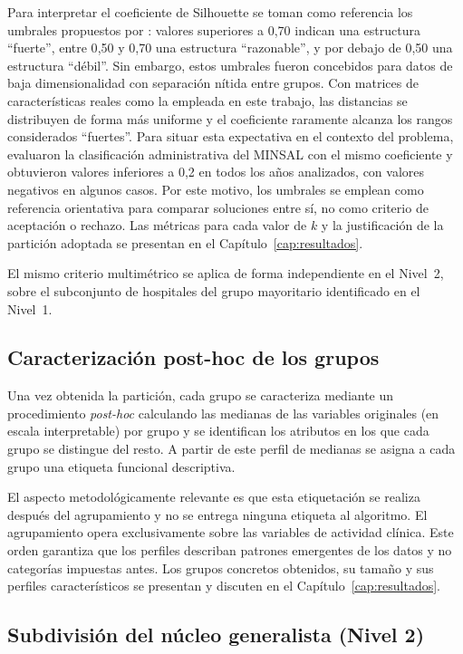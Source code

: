Para interpretar el coeficiente de Silhouette se toman como referencia los
umbrales propuestos por \citet{Rousseeuw1987}: valores superiores a
0{,}70 indican una estructura ``fuerte'', entre 0{,}50 y 0{,}70 una estructura
``razonable'', y por debajo de 0{,}50 una estructura ``débil''. Sin embargo,
estos umbrales fueron concebidos para datos de baja dimensionalidad con separación
nítida entre grupos. Con matrices de características reales como la empleada en
este trabajo, las distancias se distribuyen de forma más uniforme y el coeficiente
raramente alcanza los rangos considerados ``fuertes''. Para situar esta expectativa
en el contexto del problema, \citet{Giglio2021} evaluaron la
clasificación administrativa del MINSAL con el mismo coeficiente y obtuvieron
valores inferiores a 0{,}2 en todos los años analizados, con valores negativos en
algunos casos. Por este motivo, los umbrales se emplean como referencia
orientativa para comparar soluciones entre sí, no como criterio de aceptación o
rechazo. Las métricas para cada valor de $k$ y la justificación de la partición
adoptada se presentan en el Capítulo~\ref{cap:resultados}.

El mismo criterio multimétrico se aplica de forma independiente en el Nivel~2,
sobre el subconjunto de hospitales del grupo mayoritario identificado en el
Nivel~1.

\subsection{Caracterización post-hoc de los grupos}
\label{sec:distribucion}

Una vez obtenida la partición, cada grupo se caracteriza mediante un
procedimiento \textit{post-hoc} calculando las medianas de las variables
originales (en escala interpretable) por grupo y se identifican los atributos
en los que cada grupo se distingue del resto. A partir de este perfil de
medianas se asigna a cada grupo una etiqueta funcional descriptiva.

El aspecto metodológicamente relevante es que esta etiquetación se realiza
después del agrupamiento y no se entrega ninguna etiqueta al
algoritmo. El agrupamiento opera exclusivamente sobre las variables de actividad
clínica. Este
orden garantiza que los perfiles describan patrones emergentes de los datos y no
categorías impuestas antes. Los grupos concretos obtenidos, su tamaño
y sus perfiles característicos se presentan y discuten en el
Capítulo~\ref{cap:resultados}.

\subsection{Subdivisión del núcleo generalista (Nivel 2)}
\label{sec:nivel2-metodo}

